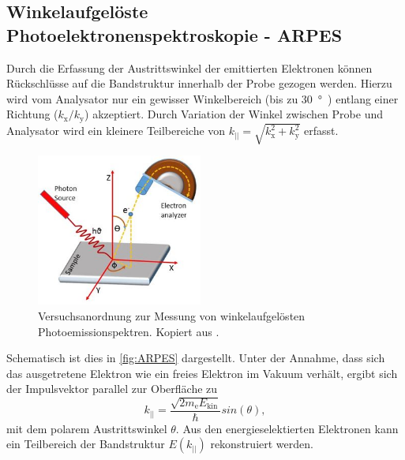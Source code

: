         \subsection{Winkelaufgelöste Photoelektronenspektroskopie - ARPES} \label{sec:ARPES}
            Durch die Erfassung der Austrittswinkel der emittierten Elektronen können Rückschlüsse auf die Bandstruktur innerhalb der Probe gezogen werden.
            Hierzu wird vom Analysator nur ein gewisser Winkelbereich (bis zu \SI{30}{\degree}~\cite{suga_photoelectron_2021}) entlang einer Richtung ($k_\text{x}/k_\text{y}$) akzeptiert.
            Durch Variation der Winkel zwischen Probe und Analysator wird ein kleinere Teilbereiche von $k_\text{||} = \sqrt{k_\text{x}^2 + k_\text{y}^2}$ erfasst.
            \begin{figure}
                \centering
                \includegraphics[height=5cm]{ARPES.jpg}
                \caption{Versuchsanordnung zur Messung von winkelaufgelösten Photoemissionspektren. Kopiert aus \cite{ARPES}.}
                \label{fig:ARPES}
            \end{figure}
            Schematisch ist dies in \autoref{fig:ARPES} dargestellt.
            Unter der Annahme, dass sich das ausgetretene Elektron wie ein freies Elektron im Vakuum verhält, ergibt sich der Impulsvektor parallel zur Oberfläche zu 
            \begin{equation}
                k_{||} = \frac{\sqrt{2 m_\text{e} E_\text{kin}}}{\hbar} sin(\theta),
            \end{equation}
            mit dem polarem Austrittswinkel $\theta$.
            Aus den energieselektierten Elektronen kann ein Teilbereich der Bandstruktur $E(k_\text{||})$ rekonstruiert werden.
            
